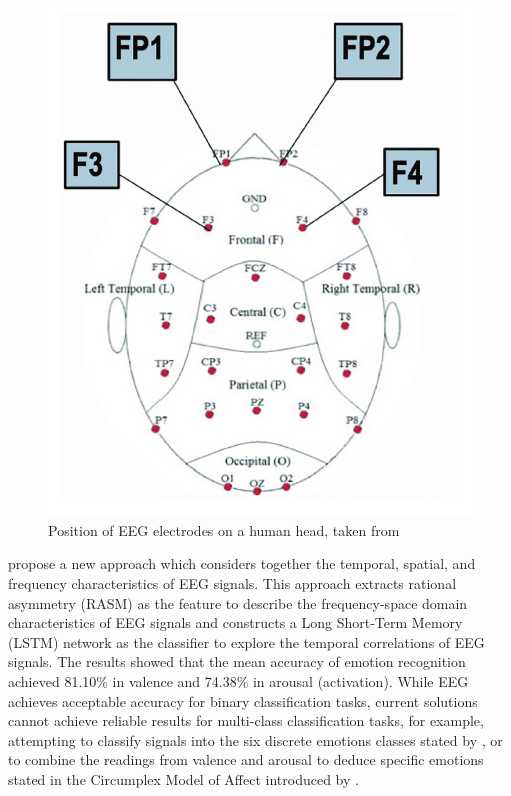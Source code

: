 \documentclass[12pt, a4paper]{article}
\begin{document}
\begin{figure}[H]
    \centering
    \includegraphics[scale=0.40]{images/eeg.png}
    \caption{Position of EEG electrodes on a human head, taken from \cite{neal2019discriminating}}
    \label{fig:eeg}
\end{figure}

\cite{li2018emotion} propose a new approach which considers together the temporal, spatial, and frequency characteristics of EEG signals. This approach extracts rational asymmetry (RASM) as the feature to describe the frequency-space domain characteristics of EEG signals and constructs a Long Short-Term Memory (LSTM) network as the classifier to explore the temporal correlations of EEG signals. The results showed that the mean accuracy of emotion recognition achieved 81.10\% in valence and 74.38\% in arousal (activation). While EEG achieves acceptable accuracy for binary classification tasks, current solutions cannot achieve reliable results for multi-class classification tasks, for example, attempting to classify signals into the six discrete emotions classes stated by \cite{ekman}, or to combine the readings from valence and arousal to deduce specific emotions stated in the Circumplex Model of Affect introduced by \cite{russell1980circumplex}.
\end{document}
